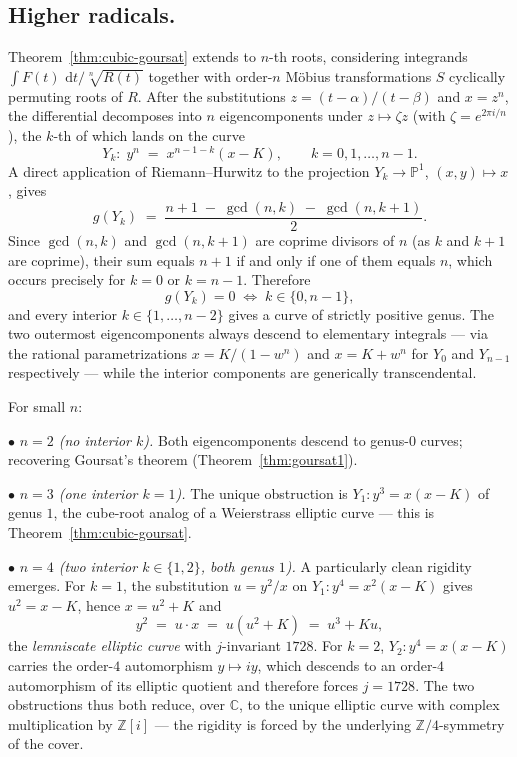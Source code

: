 \documentclass[11pt,a4paper]{article}
\theoremstyle{plain}
\theoremstyle{definition}
\theoremstyle{remark}
\newcommand{\C}{\mathbb{C}}
\newcommand{\Z}{\mathbb{Z}}
\renewcommand{\d}{\,\mathrm{d}}
\begin{document}
\subsection*{Higher radicals.}
Theorem~\ref{thm:cubic-goursat} extends to $n$-th roots, considering integrands $\int F(t)\,\d t/\sqrt[n]{R(t)}$ together with order-$n$ M\"obius transformations $S$ cyclically permuting roots of $R$. After the substitutions $z = (t-\alpha)/(t-\beta)$ and $x = z^n$, the differential decomposes into $n$ eigencomponents under $z\mapsto\zeta z$ (with $\zeta = e^{2\pi i/n}$), the $k$-th of which lands on the curve
\[
  Y_k\colon\; y^n \;=\; x^{n-1-k}(x-K), \qquad k = 0, 1, \dots, n-1.
\]
A direct application of Riemann--Hurwitz to the projection $Y_k\to\mathbb{P}^1$, $(x,y)\mapsto x$, gives
\begin{equation}\label{eq:gen-n-genus}
  g(Y_k) \;=\; \frac{n+1\;-\;\gcd(n,k)\;-\;\gcd(n,k+1)}{2}.
\end{equation}
Since $\gcd(n,k)$ and $\gcd(n,k+1)$ are coprime divisors of $n$ (as $k$ and $k+1$ are coprime), their sum equals $n+1$ if and only if one of them equals $n$, which occurs precisely for $k = 0$ or $k = n-1$. Therefore
\[
  g(Y_k) = 0 \;\iff\; k\in\{0, n-1\},
\]
and every interior $k\in\{1,\dots,n-2\}$ gives a curve of strictly positive genus. The two outermost eigencomponents always descend to elementary integrals --- via the rational parametrizations $x = K/(1-w^n)$ and $x = K + w^n$ for $Y_0$ and $Y_{n-1}$ respectively --- while the interior components are generically transcendental.

\medskip
For small $n$:

\smallskip\noindent
$\bullet$ \emph{$n=2$ (no interior $k$).} Both eigencomponents descend to genus-$0$ curves; recovering Goursat's theorem (Theorem~\ref{thm:goursat1}).

\smallskip\noindent
$\bullet$ \emph{$n=3$ (one interior $k=1$).} The unique obstruction is $Y_1\colon y^3 = x(x-K)$ of genus $1$, the cube-root analog of a Weierstrass elliptic curve --- this is Theorem~\ref{thm:cubic-goursat}.

\smallskip\noindent
$\bullet$ \emph{$n=4$ (two interior $k\in\{1,2\}$, both genus $1$).} A particularly clean rigidity emerges. For $k=1$, the substitution $u = y^2/x$ on $Y_1\colon y^4 = x^2(x-K)$ gives $u^2 = x-K$, hence $x = u^2 + K$ and
\[
  y^2 \;=\; u\cdot x \;=\; u(u^2 + K) \;=\; u^3 + Ku,
\]
the \emph{lemniscate elliptic curve} with $j$-invariant $1728$. For $k=2$, $Y_2\colon y^4 = x(x-K)$ carries the order-$4$ automorphism $y\mapsto iy$, which descends to an order-$4$ automorphism of its elliptic quotient and therefore forces $j = 1728$. The two obstructions thus both reduce, over $\C$, to the unique elliptic curve with complex multiplication by $\Z[i]$ --- the rigidity is forced by the underlying $\Z/4$-symmetry of the cover.
\end{document}
